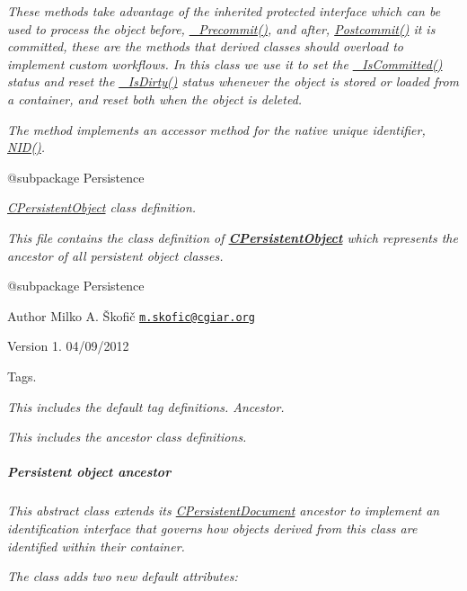 {\itshape These methods take advantage of the inherited protected interface which can be used to process the object before, \hyperlink{}{\-\_\-\-Precommit()}, and after, \hyperlink{}{Postcommit()} it is committed, these are the methods that derived classes should overload to implement custom workflows. In this class we use it to set the \hyperlink{}{\-\_\-\-Is\-Committed()} status and reset the \hyperlink{}{\-\_\-\-Is\-Dirty()} status whenever the object is stored or loaded from a container, and reset both when the object is deleted.}

{\itshape The method implements an accessor method for the native unique identifier, \hyperlink{}{N\-I\-D()}.}

{\itshape \begin{DoxyVerb} @subpackage        Persistence\end{DoxyVerb}
}

{\itshape {\itshape \hyperlink{class_c_persistent_object}{C\-Persistent\-Object}} class definition.}

{\itshape This file contains the class definition of {\bfseries \hyperlink{class_c_persistent_object}{C\-Persistent\-Object}} which represents the ancestor of all persistent object classes.}

{\itshape \begin{DoxyVerb} @subpackage        Persistence
\end{DoxyVerb}
}

{\itshape \begin{DoxyAuthor}{Author}
Milko A. Škofič \href{mailto:m.skofic@cgiar.org}{\tt m.\-skofic@cgiar.\-org} 
\end{DoxyAuthor}
\begin{DoxyVersion}{Version}
1. 04/09/2012
\end{DoxyVersion}
Tags.}

{\itshape This includes the default tag definitions. Ancestor.}

{\itshape This includes the ancestor class definitions. \subparagraph*{Persistent object ancestor}}

{\itshape }

{\itshape This {\itshape abstract} class extends its \hyperlink{class_c_persistent_document}{C\-Persistent\-Document} ancestor to implement an identification interface that governs how objects derived from this class are identified within their container.}

{\itshape The class adds two new default attributes\-:}

